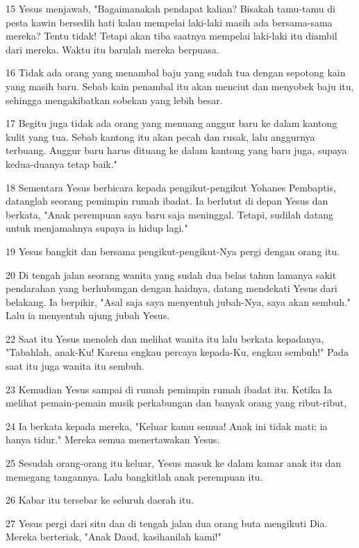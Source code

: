 \par 15 Yesus menjawab, "Bagaimanakah pendapat kalian? Bisakah tamu-tamu di pesta kawin bersedih hati kalau mempelai laki-laki masih ada bersama-sama mereka? Tentu tidak! Tetapi akan tiba saatnya mempelai laki-laki itu diambil dari mereka. Waktu itu barulah mereka berpuasa.
\par 16 Tidak ada orang yang menambal baju yang sudah tua dengan sepotong kain yang masih baru. Sebab kain penambal itu akan menciut dan menyobek baju itu, sehingga mengakibatkan sobekan yang lebih besar.
\par 17 Begitu juga tidak ada orang yang menuang anggur baru ke dalam kantong kulit yang tua. Sebab kantong itu akan pecah dan rusak, lalu anggurnya terbuang. Anggur baru harus dituang ke dalam kantong yang baru juga, supaya kedua-duanya tetap baik."
\par 18 Sementara Yesus berbicara kepada pengikut-pengikut Yohanes Pembaptis, datanglah seorang pemimpin rumah ibadat. Ia berlutut di depan Yesus dan berkata, "Anak perempuan saya baru saja meninggal. Tetapi, sudilah datang untuk menjamahnya supaya ia hidup lagi."
\par 19 Yesus bangkit dan bersama pengikut-pengikut-Nya pergi dengan orang itu.
\par 20 Di tengah jalan seorang wanita yang sudah dua belas tahun lamanya sakit pendarahan yang berhubungan dengan haidnya, datang mendekati Yesus dari belakang. Ia berpikir, "Asal saja saya menyentuh jubah-Nya, saya akan sembuh." Lalu ia menyentuh ujung jubah Yesus.
\par 22 Saat itu Yesus menoleh dan melihat wanita itu lalu berkata kepadanya, "Tabahlah, anak-Ku! Karena engkau percaya kepada-Ku, engkau sembuh!" Pada saat itu juga wanita itu sembuh.
\par 23 Kemudian Yesus sampai di rumah pemimpin rumah ibadat itu. Ketika Ia melihat pemain-pemain musik perkabungan dan banyak orang yang ribut-ribut,
\par 24 Ia berkata kepada mereka, "Keluar kamu semua! Anak ini tidak mati; ia hanya tidur." Mereka semua menertawakan Yesus.
\par 25 Sesudah orang-orang itu keluar, Yesus masuk ke dalam kamar anak itu dan memegang tangannya. Lalu bangkitlah anak perempuan itu.
\par 26 Kabar itu tersebar ke seluruh daerah itu.
\par 27 Yesus pergi dari situ dan di tengah jalan dua orang buta mengikuti Dia. Mereka berteriak, "Anak Daud, kasihanilah kami!"
